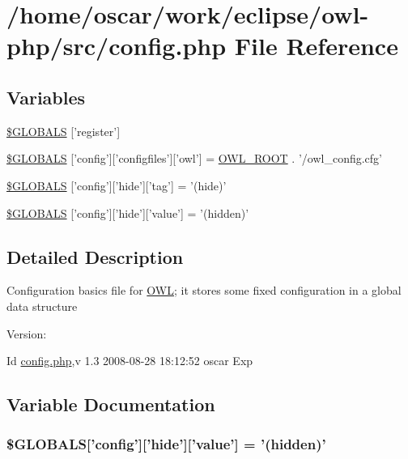 \hypertarget{config_8php}{
\section{/home/oscar/work/eclipse/owl-php/src/config.php File Reference}
\label{config_8php}
}
\subsection*{Variables}
\begin{CompactItemize}
\item 
\hyperlink{config_8php_6cc1ef3a8c20d69988531d27f931855b}{\$GLOBALS} \mbox{[}'register'\mbox{]}
\item 
\hyperlink{config_8php_36e909583250c43d72bdc7c09e2d4a20}{\$GLOBALS} \mbox{[}'config'\mbox{]}\mbox{[}'configfiles'\mbox{]}\mbox{[}'owl'\mbox{]} = \hyperlink{index_8php_35612f9a6bd7277982731a74593272c4}{OWL\_\-ROOT} . '/owl\_\-config.cfg'
\item 
\hyperlink{config_8php_15cc7b8e0baf358db666b97bd9c7fcf5}{\$GLOBALS} \mbox{[}'config'\mbox{]}\mbox{[}'hide'\mbox{]}\mbox{[}'tag'\mbox{]} = '(hide)'
\item 
\hyperlink{config_8php_7b69aee0b150d2e6556beaff4a99e589}{\$GLOBALS} \mbox{[}'config'\mbox{]}\mbox{[}'hide'\mbox{]}\mbox{[}'value'\mbox{]} = '(hidden)'
\end{CompactItemize}


\subsection{Detailed Description}
Configuration basics file for \hyperlink{classOWL}{OWL}; it stores some fixed configuration in a global data structure \begin{Desc}
\item[Version:]\end{Desc}
\begin{Desc}
\item[Id]\hyperlink{config_8php}{config.php},v 1.3 2008-08-28 18:12:52 oscar Exp \end{Desc}


\subsection{Variable Documentation}
\hypertarget{config_8php_7b69aee0b150d2e6556beaff4a99e589}{
\subsubsection{\setlength{\rightskip}{0pt plus 5cm}\$GLOBALS\mbox{[}'config'\mbox{]}\mbox{[}'hide'\mbox{]}\mbox{[}'value'\mbox{]} = '(hidden)'}}
\label{config_8php_7b69aee0b150d2e6556beaff4a99e589}


